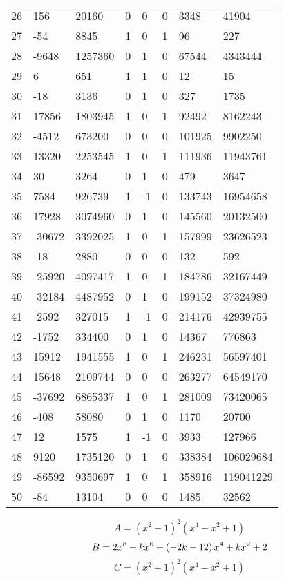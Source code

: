 \documentclass{amsart}
\begin{document}
\begin{longtable}{|l|l|l|lllll|}
26&156&20160&0&0&0&3348&41904\\
27&-54&8845&1&0&1&96&227\\
28&-9648&1257360&0&1&0&67544&4343444\\
29&6&651&1&1&0&12&15\\
30&-18&3136&0&1&0&327&1735\\
31&17856&1803945&1&0&1&92492&8162243\\
32&-4512&673200&0&0&0&101925&9902250\\
33&13320&2253545&1&0&1&111936&11943761\\
34&30&3264&0&1&0&479&3647\\
35&7584&926739&1&-1&0&133743&16954658\\
36&17928&3074960&0&1&0&145560&20132500\\
37&-30672&3392025&1&0&1&157999&23626523\\
38&-18&2880&0&0&0&132&592\\
39&-25920&4097417&1&0&1&184786&32167449\\
40&-32184&4487952&0&1&0&199152&37324980\\
41&-2592&327015&1&-1&0&214176&42939755\\
42&-1752&334400&0&1&0&14367&776863\\
43&15912&1941555&1&0&1&246231&56597401\\
44&15648&2109744&0&0&0&263277&64549170\\
45&-37692&6865337&1&0&1&281009&73420065\\
46&-408&58080&0&1&0&1170&20700\\
47&12&1575&1&-1&0&3933&127966\\
48&9120&1735120&0&1&0&338384&106029684\\
49&-86592&9350697&1&0&1&358916&119041229\\
50&-84&13104&0&0&0&1485&32562\\
\hline
\end{longtable}
$$A=(x^2
 + 1)^{2}(x^4
 - x^2
 + 1)$$
$$B=2\*x^8
 + k\*x^6
 + \left(-2\*k
 - 12\right) \*x^4
 + k\*x^2
 + 2$$
$$C=(x^2
 + 1)^{2}(x^4
 - x^2
 + 1)$$
\end{document}
